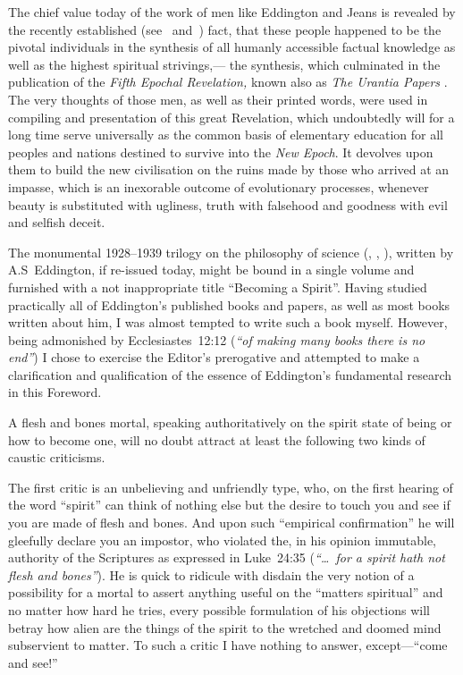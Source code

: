 \documentclass[12pt]{book}
\begin{document}
The chief value today of the work of men like Eddington and Jeans is revealed by the recently established
(see~\cite{Block1} and~\cite{Aivazian1}) fact, that these people happened to be the pivotal individuals
in the synthesis of all humanly accessible factual knowledge as well as the highest spiritual strivings,---
the synthesis, which culminated in the publication of the \emph{Fifth Epochal Revelation,} known also as
\emph{The Urantia Papers} \cite{Aivazian1}.
The very thoughts of those men, as well as their printed words, were used in compiling and presentation of this
great Revelation, which undoubtedly will for a long time serve universally as the common basis of
elementary education for all peoples and nations destined to survive into the \emph{New Epoch}.
It devolves upon them to build the new civilisation on the ruins made by those who arrived at an impasse,
which is an inexorable outcome of evolutionary processes, whenever beauty is substituted with ugliness,
truth with falsehood and goodness with evil and selfish deceit.

The monumental 1928--1939 trilogy on the philosophy of science (\cite{Eddington1}, \cite{Eddington2}, \cite{Eddington3}),
written by A.S~Eddington, if re\hyp{}issued today, might be bound in a single volume and furnished with
a not inappropriate title ``Becoming a Spirit''.
Having studied practically all of Eddington's published books and papers, as well as most books written about him,
I was almost tempted to write such a book myself.
However, being admonished by Ecclesiastes~12:12 (\emph{``of making many books there is no end''}) I chose to exercise the
Editor's prerogative and attempted to make a clarification and qualification of the essence of Eddington's
fundamental research in this Foreword.

A flesh and bones mortal, speaking authoritatively on the spirit state of being or how to become one, will no doubt
attract at least the following two kinds of caustic criticisms.

The first critic is an unbelieving and unfriendly type, who, on the first hearing of the word ``spirit''
can think of nothing else but the desire to touch you and see if you are made of flesh and bones.
And upon such ``empirical confirmation'' he will gleefully declare you an impostor, who violated the,
in his opinion immutable, authority of the Scriptures as expressed in Luke~24:35 (\emph{``\ldots\ for a spirit hath not flesh and bones''}).
He is quick to ridicule with disdain the very notion of a possibility for a mortal to assert anything useful on the ``matters spiritual''
and no matter how hard he tries, every possible formulation of his objections will betray how alien are the things of the spirit
to the wretched and doomed mind subservient to matter.
To such a critic I have nothing to answer, except---``come and see!''
\end{document}
